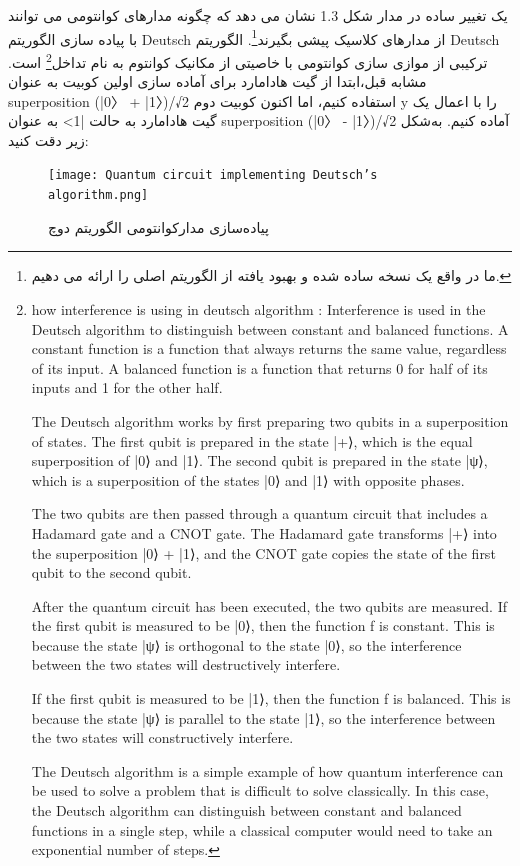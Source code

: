 \documentclass{book}
\begin{document}
 
یک تغییر ساده در مدار شکل 1.3 نشان می دهد که چگونه مدارهای کوانتومی می توانند با پیاده سازی الگوریتم Deutsch از مدارهای کلاسیک پیشی بگیرند\footnote{ما در واقع یک نسخه ساده شده و بهبود یافته از الگوریتم اصلی را ارائه می دهیم.}. الگوریتم Deutsch ترکیبی از موازی سازی کوانتومی با خاصیتی از مکانیک کوانتوم به نام تداخل\footnote{how interference is using in deutsch algorithm : Interference is used in the Deutsch algorithm to distinguish between constant and balanced functions. A constant function is a function that always returns the same value, regardless of its input. A balanced function is a function that returns 0 for half of its inputs and 1 for the other half.
	
	The Deutsch algorithm works by first preparing two qubits in a superposition of states. The first qubit is prepared in the state |+⟩, which is the equal superposition of |0⟩ and |1⟩. The second qubit is prepared in the state |ψ⟩, which is a superposition of the states |0⟩ and |1⟩ with opposite phases.
	
	The two qubits are then passed through a quantum circuit that includes a Hadamard gate and a CNOT gate. The Hadamard gate transforms |+⟩ into the superposition |0⟩ + |1⟩, and the CNOT gate copies the state of the first qubit to the second qubit.
	
	After the quantum circuit has been executed, the two qubits are measured. If the first qubit is measured to be |0⟩, then the function f is constant. This is because the state |ψ⟩ is orthogonal to the state |0⟩, so the interference between the two states will destructively interfere.
	
	If the first qubit is measured to be |1⟩, then the function f is balanced. This is because the state |ψ⟩ is parallel to the state |1⟩, so the interference between the two states will constructively interfere.
	
	The Deutsch algorithm is a simple example of how quantum interference can be used to solve a problem that is difficult to solve classically. In this case, the Deutsch algorithm can distinguish between constant and balanced functions in a single step, while a classical computer would need to take an exponential number of steps.} است.
مشابه قبل،‌ابتدا از گیت هادامارد برای آماده سازی اولین کوبیت به عنوان superposition (|0〉 + |1〉)/√2 استفاده کنیم، اما اکنون کوبیت دوم y را با اعمال یک گیت هادامارد به حالت |1> به عنوان superposition (|0〉 - |1〉)/√2 آماده کنیم. به‌شکل زیر دقت کنید:



\begin{figure}[ht]
	\centering
	\texttt{[image: Quantum circuit implementing Deutsch’s algorithm.png]}
	\caption{پیاده‌سازی مدارکوانتومی‌ الگوریتم دوچ}
\end{figure}
\end{document}
